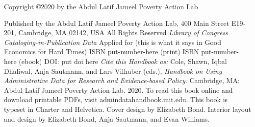  
\newcommand{\bookcopyrightyear}{2020}
\newcommand{\bookcitation}{Cole, Shawn, Iqbal Dhaliwal, Anja Sautmann, and Lars Vilhuber (eds.), {\itshape Handbook on Using Administrative Data for Research and Evidence-based Policy}. 
Cambridge, MA: Abdul Latif Jameel Poverty Action Lab. \bookcopyrightyear{}. }
\bigskip
Copyright \copyright \bookcopyrightyear{}  by the Abdul Latif Jameel Poverty Action Lab

Published by the Abdul Latif Jameel Poverty Action Lab, 400 Main Street E19-201, 
Cambridge, MA 02142, USA
\bigskip
\newline
All Rights Reserved
\bigskip
\newline
\textit{Library of Congress Cataloging-in-Publication Data}
\newline
Applied for (this is what it says in Good Economics for Hard Times)
\bigskip
\newline
ISBN put-number-here (print)
\newline ISBN put-number-here (ebook) 
\newline DOI: put doi here 
\bigskip
\newline
\textit{Cite this Handbook as: }
\newline \bookcitation{}
\bigskip
\newline
To read this book online and download printable PDFs, visit \newline admindatahandbook.mit.edu. 
\bigskip
\newline
This book is typeset in Charter and Helvetica. 
\newline Cover design by Elizabeth Bond. Interior layout and design by Elizabeth Bond, Anja Sautmann, and Evan Williams. 







